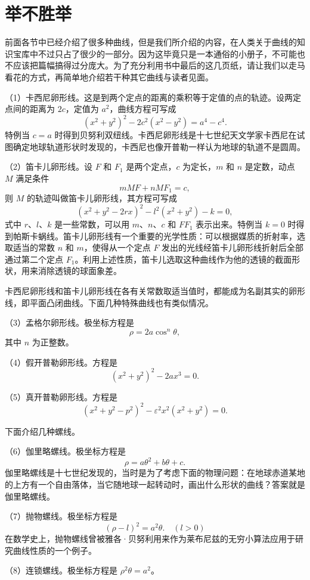 \section{举不胜举}

前面各节中已经介绍了很多种曲线，但是我们所介绍的内容，在人类关于曲线的知识宝库中不过只占了很少的一部分。因为这毕竟只是一本通俗的小册子，不可能也不应该把篇幅搞得过分庞大。为了充分利用书中最后的这几页纸，请让我们以走马看花的方式，再简单地介绍若干种其它曲线与读者见面。

（1）卡西尼卵形线。这是到两个定点的距离的乘积等于定值的点的轨迹。设两定点间的距离为 $2c$，定值为 $a^2$，曲线方程可写成
\[
  (x^2 + y^2)^2 - 2c^2(x^2 - y^2) = a^4 - c^4.
\]
特例当 $c = a$ 时得到贝努利双纽线。卡西尼卵形线是十七世纪天文学家卡西尼在试图确定地球轨道形状时发现的，卡西尼也像开普勒一样认为地球的轨道不是圆周。

（2）笛卡儿卵形线。设 $F$ 和 $F_1$ 是两个定点，$c$ 为定长，$m$ 和 $n$ 是定数，动点 $M$ 满足条件
\[
  mMF + nMF_1 = c,
\]
则 $M$ 的轨迹叫做笛卡儿卵形线，其方程可写成
\[
  (x^2 + y^2 - 2rx)^2 - l^2(x^2 + y^2) - k = 0,
\]
式中 $r$、$l$、$k$ 是一些常数，可以用 $m$、$n$、$c$ 和 $FF_1$ 表示出来。特例当 $k = 0$ 时得到帕斯卡蜗线。笛卡儿卵形线有一个重要的光学性质：可以根据媒质的折射率，选取适当的常数 $n$ 和 $m$，使得从一个定点 $F$ 发出的光线经笛卡儿卵形线折射后全部通过第二个定点 $F_1$。利用上述性质，笛卡儿选取这种曲线作为他的透镜的截面形状，用来消除透镜的球面象差。

卡西尼卵形线和笛卡儿卵形线在各有关常数取适当值时，都能成为名副其实的卵形线，即平面凸闭曲线。下面几种特殊曲线也有类似情况。

（3）孟格尔卵形线。极坐标方程是
\[
  \rho = 2a\cos^n \theta,
\]
其中 $n$ 为正整数。

（4）假开普勒卵形线。方程是
\[
  (x^2 + y^2)^2 - 2ax^3 = 0.
\]

（5）真开普勒卵形线。方程是
\[
  (x^2 + y^2 - p^2)^2 - \varepsilon^2 x^2(x^2 + y^2) = 0.
\]

下面介绍几种螺线。

（6）伽里略螺线。极坐标方程是
\[
  \rho = a\theta^2 + b\theta + c.
\]
伽里略螺线是十七世纪发现的，当时是为了考虑下面的物理问题：在地球赤道某地的上方有一个自由落体，当它随地球一起转动时，画出什么形状的曲线？答案就是伽里略螺线。

（7）抛物螺线。极坐标方程是
\[
  (\rho - l)^2 = a^2 \theta. \quad (l > 0)
\]
在数学史上，抛物螺线曾被雅各·贝努利用来作为莱布尼兹的无穷小算法应用于研究曲线性质的一个例子。

（8）连锁螺线。极坐标方程是 $\rho^2 \theta = a^2$。


